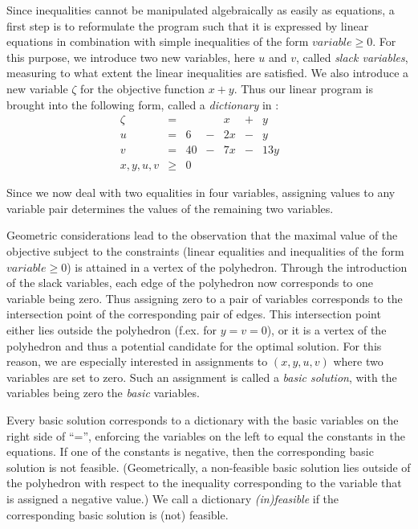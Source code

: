 \documentclass[ukenglish]{nik}
\begin{document}
Since inequalities cannot be manipulated algebraically as easily
as equations, a first step is to reformulate the program such that it is expressed
by linear equations in combination with simple inequalities of the form
$\mathit{variable}\geq 0$. For this purpose, we introduce
two new variables, here $u$ and $v$, called \emph{slack variables}, 
measuring to what extent the linear inequalities are satisfied. 
We also introduce a new variable $\zeta$
for the objective function $x+y$. 
Thus our linear program is brought into the following form, 
called a \emph{dictionary} in \cite{Vanderbei}:
\[    
    \begin{array}{lcrcrcrcr}
      \zeta&=&   & &     x &+&     y & &  \\\hline
      u    &=& 6 &-&   2 x &-&     y & &  \\
      v    &=& 40&-&   7 x &-&  13 y & &  \\
      x,y,u,v  &\geq&0     & &  & &  & &    
    \end{array}
\]

Since we now deal with two equalities in four variables, 
assigning values to any variable pair determines the values of the remaining two variables.

Geometric considerations lead to the observation that the
maximal value of the objective subject to the constraints (linear
equalities and inequalities of the form 
$\mathit{variable}\geq 0$) is attained in a vertex of the polyhedron. 
Through the introduction of the slack variables, each edge of the polyhedron now corresponds to one variable
being zero. Thus assigning zero to a pair of variables corresponds to the intersection point of the corresponding pair of edges. 
This intersection point either lies outside the polyhedron (f.ex. for $y=v=0$), or  
it is a vertex of the polyhedron and thus a potential candidate for the optimal solution. 
For this reason, we are especially interested in assignments to $(x,y,u,v)$ where two variables are set to zero. 
Such an assignment is called a \emph{basic solution}, with the variables being zero the \emph{basic} variables.

Every basic solution corresponds to a dictionary with the basic variables on the right side of ``='', 
enforcing the variables on the left to equal the constants in the equations. 
If one of the constants is negative, then the corresponding basic solution is not feasible. 
(Geometrically, a non-feasible basic solution lies outside of the polyhedron with respect to the inequality corresponding to the variable that is assigned a negative value.)
We  call a dictionary \emph{(in)feasible} if the corresponding basic solution is (not) feasible.
\end{document}
